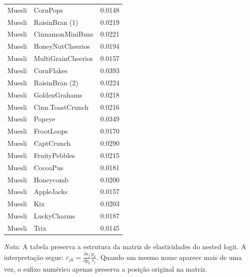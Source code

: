 \begin{table}[H]
\begin{tabular}{llr}
Muesli & CornPops & 0.0148 \\
Muesli & RaisinBran (1) & 0.0219 \\
Muesli & CinnamonMiniBuns & 0.0221 \\
Muesli & HoneyNutCheerios & 0.0194 \\
Muesli & MultiGrainCheerios & 0.0157 \\
Muesli & CornFlakes & 0.0393 \\
Muesli & RaisinBran (2) & 0.0224 \\
Muesli & GoldenGrahams & 0.0218 \\
Muesli & Cinn.ToastCrunch & 0.0216 \\
Muesli & Popeye & 0.0349 \\
Muesli & FrootLoops & 0.0170 \\
Muesli & CaptCrunch & 0.0290 \\
Muesli & FruityPebbles & 0.0215 \\
Muesli & CocoaPus & 0.0181 \\
Muesli & Honeycomb & 0.0200 \\
Muesli & AppleJacks & 0.0157 \\
Muesli & Kix & 0.0203 \\
Muesli & LuckyCharms & 0.0187 \\
Muesli & Trix & 0.0145 \\
\bottomrule
\end{tabular}

\vspace{0.3em}
\footnotesize
\textit{Nota:} A tabela preserva a estrutura da matriz de elasticidades do nested logit. A interpretação segue: $\varepsilon_{jk}=\frac{\partial s_j}{\partial p_k}\frac{p_k}{s_j}$. Quando um mesmo nome aparece mais de uma vez, o sufixo numérico apenas preserva a posição original na matriz.
\end{table}
\endgroup


